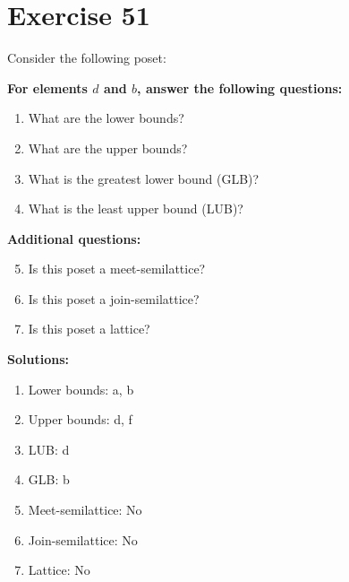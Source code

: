 \documentclass{article}
\begin{document}
\section*{Exercise 51}
Consider the following poset:
\begin{center}
\end{center}

    \textbf{For elements $d$ and $b$, answer the following questions:}
\begin{enumerate}
    \item What are the lower bounds?
    \item What are the upper bounds?
    \item What is the greatest lower bound (GLB)?
    \item What is the least upper bound (LUB)?
\end{enumerate}
    \hspace*{3ex} \textbf{Additional questions:}
\begin{enumerate}
    \setcounter{enumi}{4}
    \item Is this poset a meet-semilattice?
    \item Is this poset a join-semilattice?
    \item Is this poset a lattice?
\end{enumerate}

\textbf{Solutions:}
\begin{enumerate}
    \item Lower bounds: {a, b}
    \item Upper bounds: {d, f}
    \item LUB: d
    \item GLB: b
    \item Meet-semilattice: No
    \item Join-semilattice: No
    \item Lattice: No
\end{enumerate}
\newpage
\end{document}
